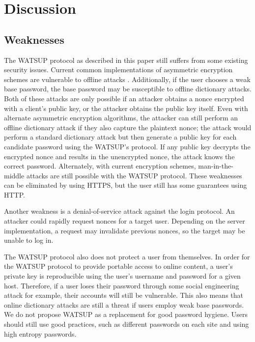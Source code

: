 \section{Discussion}
\label{sec:discussion}

\subsection{Weaknesses}

The WATSUP protocol as described in this paper still suffers from some existing security issues. Current common implementations of asymmetric encryption schemes are vulnerable to offline attacks \cite{Blumenthal:2007}. Additionally, if the user chooses a weak base password, the base password may be susceptible to offline dictionary attacks. Both of these attacks are only possible if an attacker obtains a nonce encrypted with a client's public key, or the attacker obtains the public key itself. Even with alternate asymmetric encryption algorithms, the attacker can still perform an offline dictionary attack if they also capture the plaintext nonce; the attack would perform a standard dictionary attack but then generate a public key for each candidate password using the WATSUP's protocol. If any public key decrypts the encrypted nonce and results in the unencrypted nonce, the attack knows the correct password. Alternately, with current encryption schemes, man-in-the-middle attacks are still possible with the WATSUP protocol. These weaknesses can be eliminated by using HTTPS, but the user still has some guarantees using HTTP.

Another weakness is a denial-of-service attack against the login protocol. An attacker could rapidly request nonces for a target user. Depending on the server implementation, a request may invalidate previous nonces, so the target may be unable to log in.

The WATSUP protocol also does not protect a user from themselves. In order for the WATSUP protocol to provide portable access to online content, a user's private key is reproducible using the user's username and password for a given host. Therefore, if a user loses their password through some social engineering attack for example, their accounts will still be vulnerable. This also means that online dictionary attacks are still a threat if users employ weak base passwords. We do not propose WATSUP as a replacement for good password hygiene. Users should still use good practices, such as different passwords on each site and using high entropy passwords.

